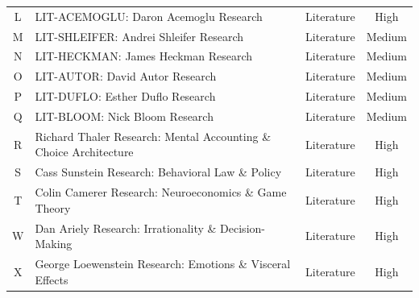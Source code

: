 \begin{table}[htbp]
\begin{tabular}{@{}cllc@{}}
L & LIT-ACEMOGLU: Daron Acemoglu Research & Literature & High \\
M & LIT-SHLEIFER: Andrei Shleifer Research & Literature & Medium \\
N & LIT-HECKMAN: James Heckman Research & Literature & Medium \\
O & LIT-AUTOR: David Autor Research & Literature & Medium \\
P & LIT-DUFLO: Esther Duflo Research & Literature & Medium \\
Q & LIT-BLOOM: Nick Bloom Research & Literature & Medium \\
R & Richard Thaler Research: Mental Accounting \& Choice Architecture & Literature & High \\
S & Cass Sunstein Research: Behavioral Law \& Policy & Literature & High \\
T & Colin Camerer Research: Neuroeconomics \& Game Theory & Literature & High \\
W & Dan Ariely Research: Irrationality \& Decision-Making & Literature & High \\
X & George Loewenstein Research: Emotions \& Visceral Effects & Literature & High \\


\end{tabular}
\end{table}
